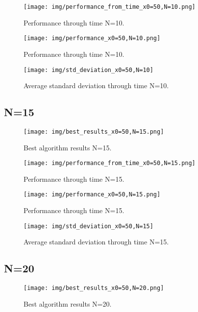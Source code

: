 \documentclass{article}
\begin{document}
\begin{figure}[H]
\centering
\texttt{[image: img/performance\_from\_time\_x0=50,N=10.png]}
\caption{Performance through time N=10.}
\label{fig:label1}
\end{figure}

\begin{figure}[H]
\centering
\texttt{[image: img/performance\_x0=50,N=10.png]}
\caption{Performance through time N=10.}
\label{fig:label1}
\end{figure}

\begin{figure}[H]
\centering
\texttt{[image: img/std\_deviation\_x0=50,N=10]}
\caption{Average standard deviation through time N=10.}
\label{fig:label1}
\end{figure}


\subsection{N=15}
\begin{figure}[H]
\centering
\texttt{[image: img/best\_results\_x0=50,N=15.png]}
\caption{Best algorithm results N=15.}
\label{fig:label1}
\end{figure}

\begin{figure}[H]
\centering
\texttt{[image: img/performance\_from\_time\_x0=50,N=15.png]}
\caption{Performance through time N=15.}
\label{fig:label1}
\end{figure}

\begin{figure}[H]
\centering
\texttt{[image: img/performance\_x0=50,N=15.png]}
\caption{Performance through time N=15.}
\label{fig:label1}
\end{figure}

\begin{figure}[H]
\centering
\texttt{[image: img/std\_deviation\_x0=50,N=15]}
\caption{Average standard deviation through time N=15.}
\label{fig:label1}
\end{figure}


\subsection{N=20}
\begin{figure}[H]
\centering
\texttt{[image: img/best\_results\_x0=50,N=20.png]}
\caption{Best algorithm results N=20.}
\label{fig:label1}
\end{figure}
\end{document}
